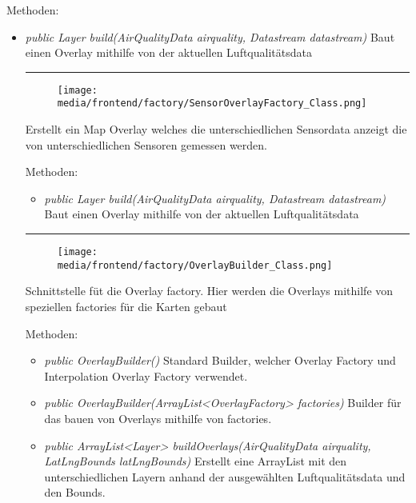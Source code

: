 Methoden:
\begin{itemize} 
    \item \emph{public Layer build(AirQualityData airquality,  Datastream datastream)} Baut einen Overlay mithilfe von der aktuellen Luftqualitätsdata

\rule{\textwidth}{0.4pt} 
\begin{minipage}{0.3\textwidth}
    \begin{figure}[H]
        \texttt{[image: media/frontend/factory/SensorOverlayFactory\_Class.png]}
    \end{figure}
    \end{minipage} \hfill
    \begin{minipage}{0.6\textwidth}
        Erstellt ein Map Overlay welches die unterschiedlichen Sensordata anzeigt die von unterschiedlichen Sensoren gemessen werden.
\end{minipage}

Methoden:
\begin{itemize} 
    \item \emph{public Layer build(AirQualityData airquality,  Datastream datastream)} Baut einen Overlay mithilfe von der aktuellen Luftqualitätsdata
\end{itemize}

\rule{\textwidth}{0.4pt} 
\begin{minipage}{0.3\textwidth}
    \begin{figure}[H]
        \texttt{[image: media/frontend/factory/OverlayBuilder\_Class.png]}
    \end{figure}
    \end{minipage} \hfill
    \begin{minipage}{0.6\textwidth}
Schnittstelle füt die Overlay factory. Hier werden die Overlays mithilfe von speziellen factories für die Karten gebaut
\end{minipage}

Methoden:
\begin{itemize} 
    \item \emph{public OverlayBuilder()} Standard Builder, welcher Overlay Factory und Interpolation Overlay Factory verwendet.
    \item \emph{public OverlayBuilder(ArrayList<OverlayFactory> factories)} Builder für das bauen von Overlays mithilfe von factories.
    \item \emph{public ArrayList<Layer> buildOverlays(AirQualityData airquality, LatLngBounds latLngBounds)} Erstellt eine ArrayList mit den unterschiedlichen Layern anhand der ausgewählten Luftqualitätsdata und den Bounds.
\end{itemize}



\end{itemize}
